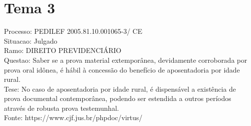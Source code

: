 \documentclass[12pt]{article}
\begin{document}
\section*{Tema 3}
Processo: PEDILEF 2005.81.10.001065-3/ CE\\
Situacao: Julgado\\
Ramo: DIREITO PREVIDENCIÁRIO\\
Questao: Saber se a prova material extemporânea, devidamente corroborada por prova oral idônea, é hábil à concessão do benefício de aposentadoria por idade rural.\\
Tese: No caso de aposentadoria por idade rural, é dispensável a existência de prova documental contemporânea, podendo ser estendida a outros períodos através de robusta prova testemunhal.\\
Fonte: https://www.cjf.jus.br/phpdoc/virtus/
\end{document}
